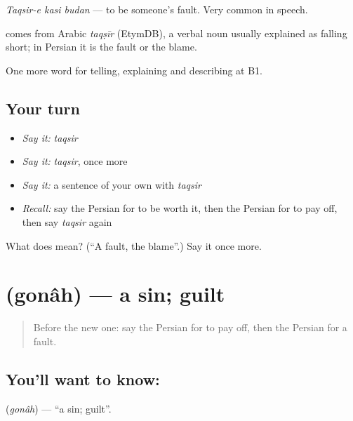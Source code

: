 \emph{Taqsir-e kasi budan} — to be someone's fault. Very common in speech.

\begin{cousinweb}
\textbf{} comes from Arabic \emph{taqṣīr} (EtymDB), a verbal noun usually explained as falling short; in Persian it is the fault or the blame.
\end{cousinweb}

\begin{grammarlens}[title={What you've built}]
One more word for telling, explaining and describing at B1.
\end{grammarlens}

\subsection*{Your turn}
\begin{itemize}
\raggedright
  \item \emph{Say it:} \emph{taqsir}
  \item \emph{Say it:} \emph{taqsir}, once more
  \item \emph{Say it:} a sentence of your own with \emph{taqsir}
  \item \emph{Recall:} say the Persian for to be worth it, then the Persian for to pay off, then say \emph{taqsir} again
\end{itemize}

\begin{tcolorbox}[breakable,colback=teal!4,colframe=teal!35!black,title={Before you move on}]
What does  mean? (\textquotedblleft{}A fault, the blame\textquotedblright{}.) Say it once more.
\end{tcolorbox}
\section[\texorpdfstring{\fa{گناه} (gonâh)}{گناه (gonâh)}]{ (gonâh) — a sin; guilt}

\label{lesson:FA-C376-gonah}



\begin{quote}
Before the new one: say the Persian for to pay off, then the Persian for a fault.
\end{quote}

\subsection*{You'll want to know: }
\textbf{} (\emph{gonâh}) — \textquotedblleft{}a sin; guilt\textquotedblright{}.

